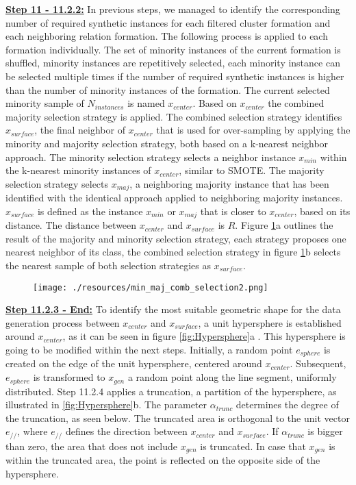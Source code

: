 \documentclass[parskip=full]{scrartcl}
\begin{document}
\textbf{\underline{Step 11 - 11.2.2:}}  In previous steps, we managed to
identify the corresponding number of required synthetic instances for each
filtered cluster formation and each neighboring relation formation. The
following process is applied to each formation individually. The set of minority
instances of the current formation is shuffled, minority instances are
repetitively selected, each minority instance can be selected multiple times if
the number of required synthetic instances is higher than the number of minority
instances of the formation. The current selected minority sample of
$N_{instances}$ is named  $x_{center}$. Based on $x_{center}$ the combined
majority selection strategy is applied. The combined selection strategy
identifies $x_{surface}$, the final neighbor of $x_{center}$ that is used for
over-sampling by applying the minority and majority selection strategy, both
based on a k-nearest neighbor approach. The minority selection strategy selects
a neighbor instance $x_{min}$ within the k-nearest minority instances of
$x_{center}$, similar to SMOTE. The majority selection strategy selects
$x_{maj}$, a neighboring majority instance that has been identified with the
identical approach applied to neighboring majority instances. $x_{surface}$ is
defined as the instance $x_{min}$ or $x_{maj}$ that is closer to $x_{center}$,
based on its distance. The distance between $x_{center}$ and $x_{surface}$ is
$R$. Figure \ref{fig:Combined}a outlines the result of the majority and minority
selection strategy, each strategy proposes one nearest neighbor of its class,
the combined selection strategy in figure \ref{fig:Combined}b selects the
nearest sample of both selection strategies as $x_{surface}$.

\begin{figure}[H]
	\centering
	\texttt{[image: ./resources/min\_maj\_comb\_selection2.png]}
	\label{fig:Combined}
\end{figure}

\textbf{\underline{Step 11.2.3 - End:}} To identify the most suitable geometric
shape for the data generation process between $x_{center}$ and $x_{surface}$, a
unit hypersphere is established around $x_{center}$, as it can be seen in figure
\ref{fig:Hypersphere}a . This hypersphere is going to be modified within the
next steps. Initially, a random point $e_{sphere}$ is created on the edge of the
unit hypersphere, centered around $x_{center}$. Subsequent, $e_{sphere}$ is
transformed to $x_{gen}$ a random point along the line segment, uniformly
distributed. Step 11.2.4 applies a truncation, a partition of the hypersphere,
as illustrated in \ref{fig:Hypersphere}b. The parameter $\alpha_{trunc}$
determines the degree of the truncation, as seen below. The truncated area is
orthogonal to the unit vector $e_{//}$, where $e_{//}$ defines the direction
between $x_{center}$ and $x_{surface}$. If $\alpha_{trunc}$ is bigger than zero,
the area that does not include $x_{gen}$ is truncated. In case that $x_{gen}$ is
within the truncated area, the point is reflected on the opposite side of the
hypersphere.
\\
\end{document}
